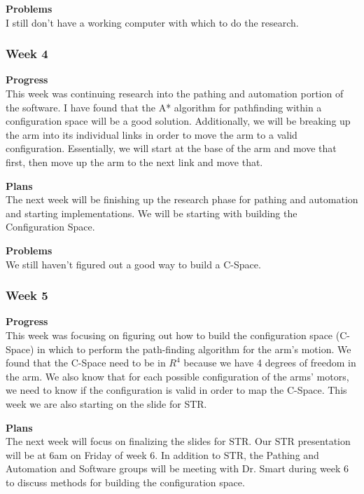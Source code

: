 \textbf{Problems} \\ 
I still don't have a working computer with which to do the research.

\subsubsection{Week 4}
\textbf{Progress} \\ 
This week was continuing research into the pathing and automation portion of the software. I have found that the A* algorithm for pathfinding within a configuration space will be a good solution. Additionally, we will be breaking up the arm into its individual links in order to move the arm to a valid configuration. Essentially, we will start at the base of the arm and move that first, then move up the arm to the next link and move that.

\textbf{Plans} \\ 
The next week will be finishing up the research phase for pathing and automation and starting implementations. We will be starting with building the Configuration Space.

\textbf{Problems} \\ 
We still haven't figured out a good way to build a C-Space.

\subsubsection{Week 5}
\textbf{Progress} \\ 
This week was focusing on figuring out how to build the configuration space (C-Space) in which to perform the path-finding algorithm for the arm's motion. We found that the C-Space need to be in \(R^4\) because we have 4 degrees of freedom in the arm. We also know that for each possible configuration of the arms' motors, we need to know if the configuration is valid in order to map the C-Space. This week we are also starting on the slide for STR.

\textbf{Plans} \\ 
The next week will focus on finalizing the slides for STR. Our STR presentation will be at 6am on Friday of week 6. In addition to STR, the Pathing and Automation and Software groups will be meeting with Dr. Smart during week 6 to discuss methods for building the configuration space.

